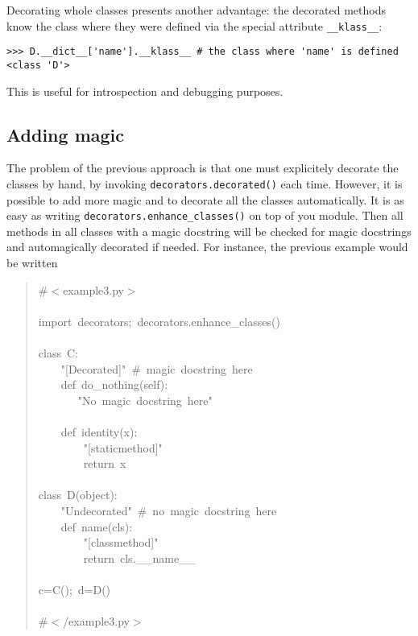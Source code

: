 \documentclass[11pt,english]{article}
\begin{document}
Decorating whole classes presents another advantage: the decorated methods know
the class where they were defined via the special attribute \texttt{{\_}{\_}klass{\_}{\_}}:
\begin{verbatim}>>> D.__dict__['name'].__klass__ # the class where 'name' is defined
<class 'D'>\end{verbatim}

This is useful for introspection and debugging purposes.



\hypertarget{adding-magic}{}
\subsection*{Adding magic}

The problem of the previous approach is that one must explicitely
decorate the classes by hand, by invoking \texttt{decorators.decorated()}
each time. However, it is possible to add more magic
and to decorate all the classes automatically. 
It is as easy as writing \texttt{decorators.enhance{\_}classes()}
on top of you module. Then all methods in all classes with a magic docstring 
will be checked for magic docstrings and automagically decorated if needed. 
For instance, the previous example would be written
\begin{quote}
\begin{ttfamily}\begin{flushleft}
\mbox{{\#}{$<$}example3.py{$>$}}\\
\mbox{}\\
\mbox{import~decorators;~decorators.enhance{\_}classes()}\\
\mbox{}\\
\mbox{class~C:}\\
\mbox{~~~~"[Decorated]"~{\#}~magic~docstring~here~}\\
\mbox{~~~~def~do{\_}nothing(self):}\\
\mbox{~~~~~~~"No~magic~docstring~here"}\\
\mbox{}\\
\mbox{~~~~def~identity(x):}\\
\mbox{~~~~~~~~"[staticmethod]"}\\
\mbox{~~~~~~~~return~x}\\
\mbox{}\\
\mbox{class~D(object):}\\
\mbox{~~~~"Undecorated"~{\#}~no~magic~docstring~here}\\
\mbox{~~~~def~name(cls):}\\
\mbox{~~~~~~~~"[classmethod]"}\\
\mbox{~~~~~~~~return~cls.{\_}{\_}name{\_}{\_}}\\
\mbox{}\\
\mbox{c=C();~d=D()}\\
\mbox{}\\
\mbox{{\#}{$<$}/example3.py{$>$}}
\end{flushleft}\end{ttfamily}
\end{quote}
\end{document}
